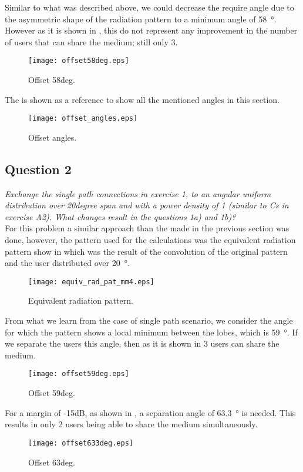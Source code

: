 Similar to what was described above, we could decrease the require angle due to the asymmetric shape of the radiation pattern to a minimum angle of \SI{58}{\degree}. However as it is shown in , this do not represent any improvement in the number of users that can share the medium; still only 3.

\begin{figure}[!h]
  \centering
  \texttt{[image: offset58deg.eps]}
  \caption{Offset 58deg.}
  \label{fig:offset58deg}
\end{figure}

The  is shown as a reference to show all the mentioned angles in this section.

\begin{figure}[!h]
  \centering
  \texttt{[image: offset\_angles.eps]}
  \caption{Offset angles.}
  \label{fig:offset_angles}
\end{figure}

\subsection{Question 2}
\textit{Exchange the single path connections in exercise 1, to an angular uniform distribution over 20degree span and with a power density of 1 (similar to Cs in exercise A2). What changes result in the questions 1a) and 1b)?}\\

For this problem a similar approach than the made in the previous section was done, however, the pattern used for the calculations was the equivalent radiation pattern show in  which was the result of the convolution of the original pattern and the user distributed over \SI{20}{\degree}.

\begin{figure}[!h]
  \centering
  \texttt{[image: equiv\_rad\_pat\_mm4.eps]}
  \caption{Equivalent radiation pattern.}
  \label{fig:equiv_rad_pat_mm4}
\end{figure}

From what we learn from the case of single path scenario, we consider the angle for which the pattern shows a local minimum between the lobes, which is \SI{59}{\degree}. If we separate the users this angle, then as it is shown in  3 users can share the medium.

\begin{figure}[!h]
  \centering
  \texttt{[image: offset59deg.eps]}
  \caption{Offset 59deg.}
  \label{fig:offset59deg}
\end{figure}

For a margin of -15dB, as shown in , a separation angle of \SI{63.3}{\degree} is needed. This results in only 2 users being able to share the medium simultaneously.

\begin{figure}[!h]
  \centering
  \texttt{[image: offset633deg.eps]}
  \caption{Offset 63deg.}
  \label{fig:offset633deg}
\end{figure}